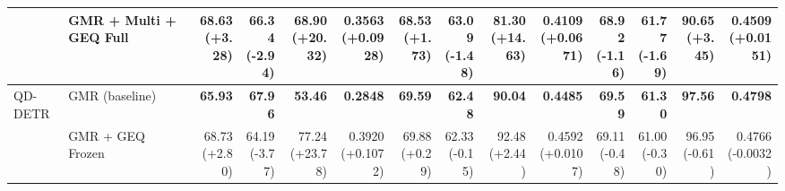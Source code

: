 \documentclass{article}
\begin{document}
{\begin{tabular}{llrrrrrrrrrrrr}
 & GMR + Multi + GEQ Full & \shortstack{68.63 \\ {\scriptsize\textcolor{Gain}{(+3.28)}}} & \shortstack{66.34 \\ {\scriptsize\textcolor{Loss}{(-2.94)}}} & \shortstack{68.90 \\ {\scriptsize\textcolor{Gain}{(+20.32)}}} & \shortstack{0.3563 \\ {\scriptsize\textcolor{Gain}{(+0.0928)}}} & \shortstack{68.53 \\ {\scriptsize\textcolor{Gain}{(+1.73)}}} & \shortstack{63.09 \\ {\scriptsize\textcolor{Loss}{(-1.48)}}} & \shortstack{81.30 \\ {\scriptsize\textcolor{Gain}{(+14.63)}}} & \shortstack{0.4109 \\ {\scriptsize\textcolor{Gain}{(+0.0671)}}} & \shortstack{68.92 \\ {\scriptsize\textcolor{Loss}{(-1.16)}}} & \shortstack{61.77 \\ {\scriptsize\textcolor{Loss}{(-1.69)}}} & \shortstack{90.65 \\ {\scriptsize\textcolor{Gain}{(+3.45)}}} & \shortstack{0.4509 \\ {\scriptsize\textcolor{Gain}{(+0.0151)}}} \\
\midrule
QD-DETR & GMR (baseline) & \textbf{65.93} & \textbf{67.96} & \textbf{53.46} & \textbf{0.2848} & \textbf{69.59} & \textbf{62.48} & \textbf{90.04} & \textbf{0.4485} & \textbf{69.59} & \textbf{61.30} & \textbf{97.56} & \textbf{0.4798} \\
 & GMR + GEQ Frozen & \shortstack{68.73 \\ {\scriptsize\textcolor{Gain}{(+2.80)}}} & \shortstack{64.19 \\ {\scriptsize\textcolor{Loss}{(-3.77)}}} & \shortstack{77.24 \\ {\scriptsize\textcolor{Gain}{(+23.78)}}} & \shortstack{0.3920 \\ {\scriptsize\textcolor{Gain}{(+0.1072)}}} & \shortstack{69.88 \\ {\scriptsize\textcolor{Gain}{(+0.29)}}} & \shortstack{62.33 \\ {\scriptsize\textcolor{Loss}{(-0.15)}}} & \shortstack{92.48 \\ {\scriptsize\textcolor{Gain}{(+2.44)}}} & \shortstack{0.4592 \\ {\scriptsize\textcolor{Gain}{(+0.0107)}}} & \shortstack{69.11 \\ {\scriptsize\textcolor{Loss}{(-0.48)}}} & \shortstack{61.00 \\ {\scriptsize\textcolor{Loss}{(-0.30)}}} & \shortstack{96.95 \\ {\scriptsize\textcolor{Loss}{(-0.61)}}} & \shortstack{0.4766 \\ {\scriptsize\textcolor{Loss}{(-0.0032)}}} \\

\end{tabular}}
\end{document}
